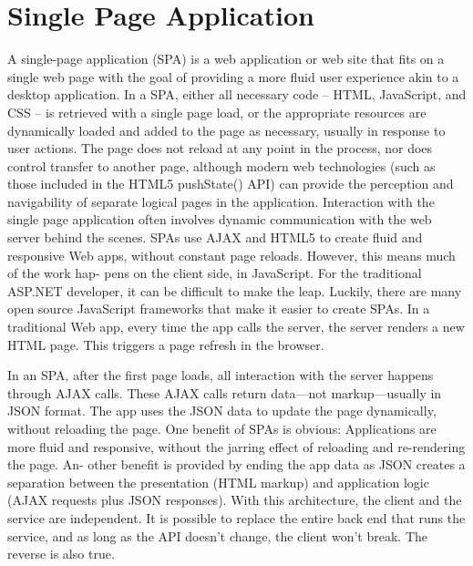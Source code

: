 \section{Single Page Application}
\label{sec:single_page_application}

A single-page application (SPA) is a web application or web site that fits on a single web page with the goal of providing a more fluid user experience akin to a desktop application. In a SPA, either all necessary code – HTML, JavaScript, and CSS – is retrieved with a single page load,\cite{arc_asp} or the appropriate resources are dynamically loaded and added to the page as necessary, usually in response to user actions. The page does not reload at any point in the process, nor does control transfer to another page, although modern web technologies (such as those included in the HTML5 pushState() API) can provide the perception and navigability of separate logical pages in the application. Interaction with the single page application often involves dynamic communication with the web server behind the scenes. 
SPAs use AJAX and HTML5 to create fluid and responsive Web apps, without constant page reloads. However, this means much of the work hap- pens on the client side, in JavaScript. For the traditional ASP.NET developer, it can be difficult to make the leap. Luckily, there are many open source JavaScript frameworks that make it easier to create SPAs. 
In a traditional Web app, every time the app calls the server, the server renders a new HTML page. This triggers a page refresh in the browser.


In an SPA, after the first page loads, all interaction with the server happens through AJAX calls. These AJAX calls return data—not markup—usually in JSON format. The app uses the JSON data to update the page dynamically, without reloading the page. 
One benefit of SPAs is obvious: Applications are more fluid and responsive, without the jarring effect of reloading and re-rendering the page. An- other benefit is provided by ending the app data as JSON creates a separation between the presentation (HTML markup) and application logic (AJAX requests plus JSON responses). With this architecture, the client and the service are independent. It is possible to replace the entire back end that runs the service, and as long as the API doesn’t change, the client won’t break. The reverse is also true.